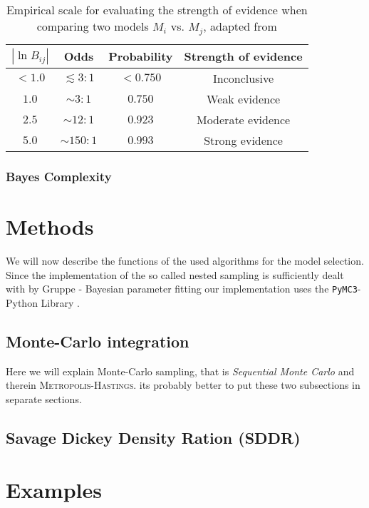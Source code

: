 \documentclass[%
 reprint,
 amsmath,amssymb,
 aps,
]{revtex4-1}
\begin{document}
\begin{table}[htbp]
	\centering
	{\renewcommand{\arraystretch}{1.3}
	\begin{tabular}{|c|c|c|c|}
		\hline
		$|\ln B_{ij}|$& Odds & Probability & Strength of evidence \\
		\hline
		$< 1.0$& $ \lesssim 3:1$ & $< 0.750$  & Inconclusive  \\
		$1.0$ & $\sim 3:1$ & $0.750$ & Weak evidence  \\
		$2.5$& $\sim 12:1$ & $0.923$ & Moderate evidence \\
		$5.0$& $\sim 150:1$ & $0.993$ & Strong evidence \\
		\hline
	\end{tabular}}
\caption{Empirical scale for evaluating the strength of evidence when comparing two models $M_i$ vs. $M_j$, adapted from \cite{Trotta_2008}}
\end{table}


\subsubsection{Bayes Complexity}



\section{Methods}
\noindent We will now describe the functions of the used algorithms for the model selection. Since the implementation of the so called nested sampling is sufficiently dealt with by {\color{red} Gruppe - Bayesian parameter fitting} our implementation uses the \texttt{PyMC3}-Python Library \cite{PyMC3}.
 
\subsection{Monte-Carlo integration}
Here we will explain Monte-Carlo sampling, that is \emph{Sequential Monte Carlo} and therein \textsc{Metropolis-Hastings}. its probably better to put these two subsections in separate sections.

\subsection{Savage Dickey Density Ration (SDDR)}


\section{Examples}
\end{document}
